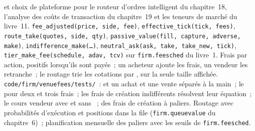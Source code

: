 \begin{build}
  et choix de plateforme pour le routeur d'ordres intelligent du chapitre~18, l'analyse des coûts de transaction du chapitre~19 et
les teneurs de marché du livre~11.
 \texttt{fee\_adjusted(price, side, fee)}, \texttt{effective\_tick(tick, fees)}, \texttt{route\_take(quotes, side, qty)},
\texttt{passive\_value(fill, capture, adverse, make)}, \texttt{indifference\_make(\dots)}, \texttt{neutral\_ask(ask, take, take\_new, tick)},
 \texttt{tier\_make\_fee(schedule, adav, tcv)} sur \texttt{firm.feesched} du livre~1.
 Frais par action, positifs lorsqu'ils sont payés~; un acheteur ajoute les frais, un vendeur les retranche~; le routage trie les cotations par , sur la
seule taille affichée.
 \texttt{code/firm/venuefees/tests/}~:  et un achat et une vente séparés à la main~; le  pour deux et
trois frais~; les frais de création indifférents résolvent leur équation~; le cours vendeur  avec et sans ~; des frais de création à paliers.
 Routage avec probabilités d'exécution et positions dans la file (\texttt{firm.queuevalue} du chapitre~6)~; planification mensuelle des paliers avec les seuils de
\texttt{firm.feesched}.
\end{build}

